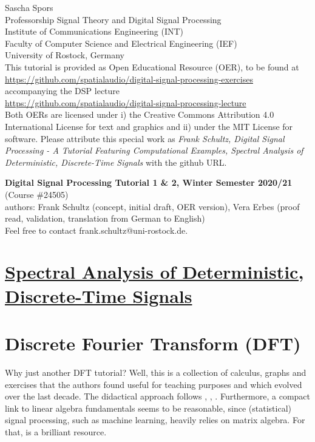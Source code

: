 \documentclass[11pt,a4paper,DIV=12]{scrartcl}
\begin{document}
{\raggedleft Sascha Spors\\
Professorship Signal Theory and Digital Signal Processing\\
Institute of Communications Engineering (INT)\\
Faculty of Computer Science and Electrical Engineering (IEF)\\
University of Rostock, Germany\\}
\vspace{0.5cm}
\noindent This tutorial is provided as Open Educational Resource (OER),
to be found at\\
\url{https://github.com/spatialaudio/digital-signal-processing-exercises}\\
accompanying the DSP lecture\\
\url{https://github.com/spatialaudio/digital-signal-processing-lecture}\\
Both OERs are licensed under i) the Creative Commons Attribution 4.0 International
License for text and graphics and ii) under the MIT License for software.
%
Please attribute this special work as
\textit{Frank Schultz, Digital Signal Processing - A
Tutorial Featuring Computational Examples, Spectral Analysis of Deterministic,
Discrete-Time Signals} with the github URL.
\newline

\textbf{Digital Signal Processing Tutorial 1 \& 2, Winter Semester 2020/21}
(Course \#24505)\\
authors: Frank Schultz (concept, initial draft, OER version),
Vera Erbes (proof read, validation, translation from German to English)\\
Feel free to contact frank.schultz@uni-rostock.de.

\section*{\underline{Spectral Analysis of Deterministic, Discrete-Time Signals}}
\renewcommand{\contentsname}{}
\tableofcontents
\vspace{.7cm}

\section{Discrete Fourier Transform (DFT)}
Why just another DFT tutorial? Well, this is a collection of calculus,
graphs and exercises that the authors found useful for teaching purposes
and which evolved over the last decade.
%
The didactical approach follows \cite{Rabiner1975}, \cite{Kammeyer2002},
\cite{Moeser2011}.
%
Furthermore, a compact link to linear algebra fundamentals seems to be
reasonable, since (statistical) signal processing, such as machine learning,
heavily relies on matrix algebra. For that, \cite{Strang2019} is a brilliant
resource.
\end{document}
